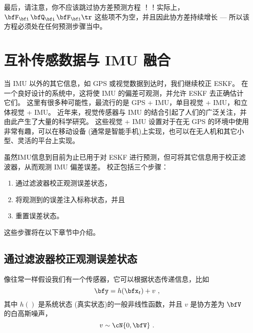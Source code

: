最后，请注意，你不应该跳过协方差预测方程 ！！实际上， $\bfF_\bfi\,\bfQ_\bfi\,\bfF_\bfi\tr$ 这些项不为空，并且因此协方差持续增长 --- 所以该方程必须处在任何预测步骤当中。


\section{互补传感数据与 IMU 融合}
\label{sec:fusion}

当 IMU 以外的其它信息，如 GPS 或视觉数据到达时，我们继续校正 ESKF。
在一个良好设计的系统中，这将使 IMU 的偏差可观测，并允许 ESKF 去正确估计它们。 
这里有很多种可能性，最流行的是 GPS + IMU，单目视觉 + IMU，和立体视觉 + IMU。 
近年来，视觉传感器与 IMU 的结合引起了人们的广泛关注，并由此产生了大量的科学研究。 
这些视觉 + IMU 设置对于在无 GPS 的环境中使用非常有趣，可以在移动设备 (通常是智能手机)上实现，也可以在无人机和其它小型、灵活的平台上实现。

\bigskip

虽然IMU信息到目前为止已用于对 ESKF 进行预测，但可将其它信息用于校正滤波器，从而观测 IMU 偏差误差。 
校正包括三个步骤：
\begin{enumerate}
\item
 通过滤波器校正观测误差状态， 
\item
 将观测到的误差注入标称状态，并且
\item	
 重置误差状态。 
\end{enumerate}%
%
这些步骤将在以下章节中介绍。

\subsection{通过滤波器校正观测误差状态}

像往常一样假设我们有一个传感器，它可以根据状态传递信息，比如
%
\begin{equation}
\bfy = h(\bfx_t) + v~,
\end{equation}
%
其中 $h()$ 是系统状态 (真实状态)的一般非线性函数，并且 $v$ 是协方差为 $\bfV$ 的白高斯噪声，
%
\begin{equation}
v\sim\cN\{0,\bfV\}~.
\end{equation}

